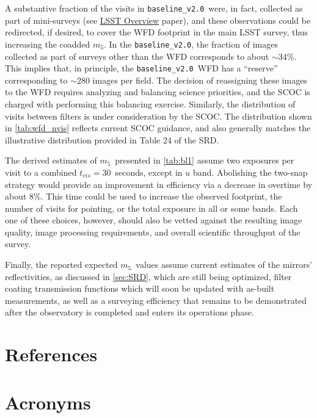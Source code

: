 \documentclass[PST,authoryear,toc]{lsstdoc}
\newcommand{\mf}{\ensuremath{m_5}}
\newcommand{\baseline}{\texttt{baseline\_v2.0}}
\begin{document}
 A substantive fraction of the visits in \baseline\ were, in fact, collected as part of mini-surveys (see  \href{https://ls.st/lop}{{LSST Overview}} paper), and these observations could be redirected, if desired, to cover the WFD footprint in the main LSST survey, thus increasing the coadded \mf. In the \baseline, the fraction of images collected as part of surveys other than the WFD corresponds to about  $\sim34\%$. This implies that, in principle, the \baseline\ WFD has a ``reserve'' corresponding to $\sim280$ images per field.  The decision of reassigning these images to the WFD requires analyzing and balancing  science priorities, and the SCOC is charged with performing this balancing exercise. Similarly, the distribution of visits between filters is under consideration by the SCOC.  The distribution shown in \autoref{tab:wfd_nvis} reflects current SCOC guidance, and also generally matches the illustrative distribution provided in Table 24 of the SRD.


The derived estimates of \mf\ presented in \autoref{tab:bl1} assume two exposures per visit to a combined $t_{vis}=30$~seconds, except in $u$ band. Abolishing the two-snap strategy would provide an improvement in efficiency via a decrease in overtime by about 8\%. This time could be used to increase the observed footprint, the number of visits for pointing, or the total exposure in all or some bands. Each one of these choices, however, should also be vetted against the resulting image quality, image processing requirements, and overall scientific throughput of the survey.

Finally, the reported expected \mf\ values assume current estimates of the mirrors' reflectivities, as discussed in \autoref{sec:SRD}, which are still being optimized, filter coating transmission functions which will soon be updated with as-built measurements, as well as a surveying efficiency that remains to be demonstrated after the observatory is completed and enters its operations phase.


\appendix
\section{References} \label{sec:bib}
\renewcommand{\refname}{} %


\section{Acronyms} \label{sec:acronyms}

\end{document}

